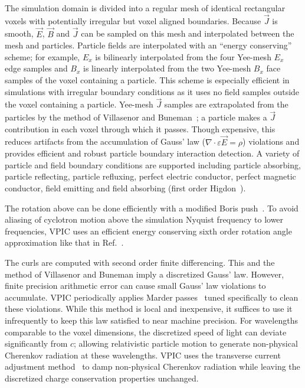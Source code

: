 \documentclass[journal,twoside]{IEEEtran}
\newcommand{\eps}{\varepsilon}
\newcommand{\vecJ}{\vec{J}}
\newcommand{\vecE}{\vec{E}}
\newcommand{\vecB}{\vec{B}}
\newcommand{\Div}[1]{\nabla \cdot #1}
\begin{document}
The simulation domain is divided into a regular mesh of identical
rectangular voxels with potentially irregular but voxel aligned
boundaries.  Because $\vecJ$ is smooth, $\vecE$, $\vecB$ and $\vecJ$
can be sampled on this mesh and interpolated between the mesh and
particles.  Particle fields are interpolated with an ``energy
conserving'' scheme; for example, $E_x$ is bilinearly interpolated
from the four Yee-mesh $E_x$ edge samples and $B_x$ is linearly
interpolated from the two Yee-mesh $B_x$ face samples of the voxel
containing a particle.  This scheme is especially efficient in
simulations with irregular boundary conditions as it uses no field
samples outside the voxel containing a particle.  Yee-mesh $\vecJ$
samples are extrapolated from the particles by the method of
Villasenor and Buneman~\cite{Villasenor_Buneman_1992}; a particle
makes a $\vecJ$ contribution in each voxel through which it passes.
Though expensive, this reduces artifacts from the accumulation of
Gauss' law ($\Div{\eps\vecE}=\rho$) violations and provides efficient
and robust particle boundary interaction detection.  A variety of
particle and field boundary conditions are supported including
particle absorbing, particle reflecting, particle refluxing, perfect
electric conductor, perfect magnetic conductor, field emitting and
field absorbing (first order Higdon~\cite{Higdon_1986}).

The rotation above can be done efficiently with a modified Boris
push~\cite{Boris_1970}.  To avoid aliasing of cyclotron motion above the
simulation Nyquist frequency to lower frequencies, VPIC uses an
efficient energy conserving sixth order rotation angle approximation
like that in Ref.~\cite{Blahovec_et_al_2000}.

The curls are computed with second order finite differencing.  This
and the method of Villasenor and Buneman imply a discretized Gauss'
law.  However, finite precision arithmetic error can cause small
Gauss' law violations to accumulate.  VPIC periodically applies Marder
passes~\cite{Marder_1987} tuned specifically to clean these
violations.  While this method is local and inexpensive, it suffices
to use it infrequently to keep this law satisfied to near machine
precision.  For wavelengths comparable to the voxel dimensions, the
discretized speed of light can deviate significantly from $c$;
allowing relativistic particle motion to generate non-physical
Cherenkov radiation at these wavelengths.  VPIC uses the transverse
current adjustment method~\cite{Eastwood_et_al_1995} to damp
non-physical Cherenkov radiation while leaving the discretized charge
conservation properties unchanged.
\end{document}
